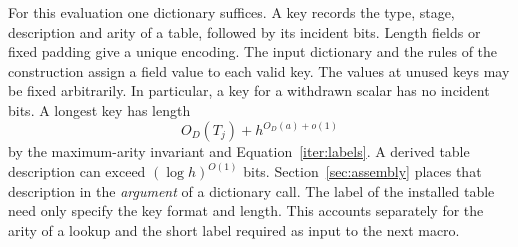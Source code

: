 For this evaluation one dictionary suffices. A key records the type,
stage, description and arity of a table, followed by its incident bits.
Length fields or fixed padding give a unique encoding. The input
dictionary and the rules of the construction assign a field value
to each valid key. The values at unused keys may be fixed arbitrarily.
In particular, a key for a withdrawn scalar has no incident bits.
A longest key has length
\[
 O_D(T_j)+h^{O_D(a)+o(1)}
\]
by the maximum-arity invariant and Equation~\eqref{iter:labels}.
A derived table description can exceed $(\log h)^{O(1)}$ bits. Section~\ref{sec:assembly} places that description in the \emph{argument} of a dictionary call. The label of the installed table need only specify the key format and length. This accounts separately for the arity of a lookup and the short label required as input to the next macro.
